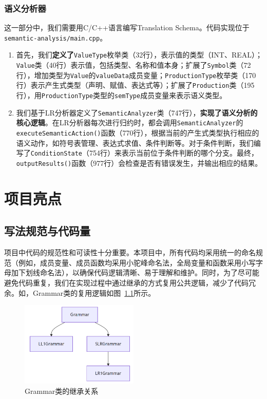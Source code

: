 \documentclass[UTF8,openany]{ctexbook}
\begin{document}
\subsection{语义分析器}

这一部分中，我们需要用C/C++语言编写Translation Schema。代码实现位于 \texttt{semantic-analysis/main.cpp}。

\begin{enumerate}[noitemsep,topsep=0pt,partopsep=0pt]
    \item 首先，我们\textbf{定义了}\texttt{ValueType}枚举类（32行），表示值的类型（INT、REAL）；\texttt{Value}类（40行）表示值，包括类型、名称和值本身；扩展了\texttt{Symbol}类（72行），增加类型为\texttt{Value}的\texttt{valueData}成员变量；\texttt{ProductionType}枚举类（170行）表示产生式类型（声明、赋值、表达式等）；扩展了\texttt{Production}类（195行），用\texttt{ProductionType}类型的\texttt{semType}成员变量来表示语义类型。
    \item 我们基于LR分析器定义了\texttt{SemanticAnalyzer}类（747行），\textbf{实现了语义分析的核心逻辑}。在LR分析器每次进行归约时，都会调用\texttt{SemanticAnalyzer}的\texttt{executeSemanticAction()}函数（770行），根据当前的产生式类型执行相应的语义动作，如符号表管理、表达式求值、条件判断等。对于条件判断，我们编写了\texttt{ConditionState}（754行）来表示当前位于条件判断的哪个分支。最终，\texttt{outputResults()}函数（977行）会检查是否有错误发生，并输出相应的结果。
\end{enumerate}

\chapter{项目亮点}
\label{sec:highlights}

\section{写法规范与代码量}

项目中代码的规范性和可读性十分重要。本项目中，所有代码均采用统一的命名规范（例如，成员变量、成员函数均采用小驼峰命名法，全局变量和函数采用小写字母加下划线命名法），以确保代码逻辑清晰、易于理解和维护。同时，为了尽可能避免代码重复，我们在实现过程中通过继承的方式复用公共逻辑，减少了代码冗余。如，Grammar类的复用逻辑如图~\ref{fig:grammar_inheritance}所示。

\begin{figure}
\centering
\includegraphics[width=0.5\textwidth]{extension.png}
\caption{Grammar类的继承关系}
\label{fig:grammar_inheritance}
\end{figure}
\end{document}

